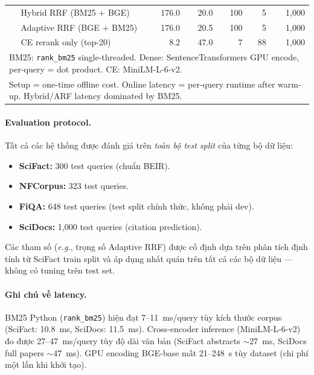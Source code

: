 \begin{table}[htbp]
{\begin{tabular}{llrrrrr}
                          & Hybrid RRF (BM25 + BGE)        & 176.0 & 20.0  & 100 & 5   & 1{,}000 \\
                          & Adaptive RRF (BGE + BM25)      & 176.0 & 20.5  & 100 & 5   & 1{,}000 \\
                          & CE rerank only (top-20)        & 8.2   & 47.0  & 7   & 88  & 1{,}000 \\
\midrule
\multicolumn{7}{l}{\footnotesize BM25: \texttt{rank\_bm25} single-threaded. Dense: SentenceTransformers GPU encode, per-query = dot product. CE: MiniLM-L-6-v2.}\\
\multicolumn{7}{l}{\footnotesize Setup = one-time offline cost. Online latency = per-query runtime after warm-up. Hybrid/ARF latency dominated by BM25.}\\
\bottomrule
\end{tabular}
}
\end{table}

\paragraph{Evaluation protocol.}
Tất cả các hệ thống được đánh giá trên \emph{toàn bộ test split} của từng bộ dữ liệu:
\begin{itemize}[leftmargin=1.6em,itemsep=2pt]
  \item \textbf{SciFact:} 300 test queries (chuẩn BEIR).
  \item \textbf{NFCorpus:} 323 test queries.
  \item \textbf{FiQA:} 648 test queries (test split chính thức, không phải dev).
  \item \textbf{SciDocs:} 1{,}000 test queries (citation prediction).
\end{itemize}

Các tham số (\textit{e.g.}, trọng số Adaptive RRF) được cố định dựa trên phân tích định tính từ SciFact
train split và áp dụng nhất quán trên tất cả các bộ dữ liệu --- không có tuning trên test set.

\paragraph{Ghi chú về latency.}
BM25 Python (\texttt{rank\_bm25}) hiện đạt 7--11~ms/query tùy kích thước corpus (SciFact: 10.8~ms, SciDocs: 11.5~ms).
Cross-encoder inference (MiniLM-L-6-v2) đo được 27--47~ms/query tùy độ dài văn bản (SciFact abstracts $\sim$27~ms,
SciDocs full papers $\sim$47~ms). GPU encoding BGE-base mất 21--248~s tùy dataset (chi phí một lần khi khởi tạo).
